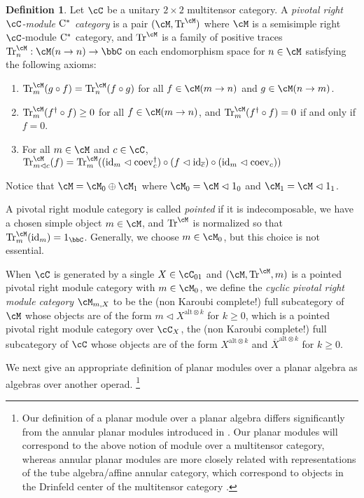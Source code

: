 \documentclass[11pt]{article}
\theoremstyle{plain}
\theoremstyle{definition}
\newtheorem{defn}[thm]{Definition}
\DeclareMathOperator{\coev}{coev}
\DeclareMathOperator{\id}{id}
\DeclareMathOperator{\Tr}{Tr}
\newcommand{\Cstar}{\rm{C^*}}
\begin{document}
\begin{defn}
 \label{def:PivotalModule}
Let $\cC$ be a unitary $2\times 2$ multitensor category.
A \emph{pivotal right $\cC$-module $\Cstar$ category} is a pair $(\cM,\Tr^\cM)$ where
$\cM$ is a semisimple right $\cC$-module $\Cstar$ category, and $\Tr^\cM$ is a family of positive traces $\Tr^\cM_n:\cM(n \to n)\to \bbC$ on each endomorphism space for $n\in \cM$ satisfying the following axioms:
\begin{enumerate}[label={\rm(Tr\arabic*)}]
\item
\label{PivotalModule:tracial}
$\Tr^\cM_m(g \circ f) = \Tr^\cM_n(f\circ g)$ for all $f\in \cM(m\to n)$ and $g\in \cM(n \to m)$.
\item
\label{PivotalModule:positive}
$\Tr^\cM_m(f^\dag \circ f) \geq 0$ for all $f\in \cM(m \to n)$, and $\Tr^\cM_m(f^\dag \circ f) =0$ if and only if $f = 0$.
\item
\label{PivotalModule:compatible}
For all $m\in \cM$ and $c\in \cC$,
$
\Tr^\cM_{m\vartriangleleft c}(f)
=
\Tr^\cM_{m}(
(\id_m \vartriangleleft \coev_c^\dag) \circ (f\vartriangleleft \id_{\overline{c}}) \circ (\id_m \vartriangleleft \coev_c)
)
$
\end{enumerate}
Notice that $\cM = \cM_0 \oplus \cM_1$ where $\cM_0 = \cM \vartriangleleft 1_0$ and $\cM_1 = \cM\vartriangleleft 1_1$.

A pivotal right module category is called \emph{pointed} if it is indecomposable, we have a chosen simple object $m\in \cM$, and $\Tr^\cM$ is normalized so that $\Tr^\cM_m(\id_m) = 1_\bbC$.
Generally, we choose $m\in \cM_0$, but this choice is not essential.

When $\cC$ is generated by a single $X\in \cC_{01}$ and $(\cM,\Tr^\cM,m)$ is a pointed pivotal right module category with $m\in \cM_0$, we define the \emph{cyclic pivotal right module category} $\cM_{m,X}$ to be the (non Karoubi complete!) full subcategory of $\cM$ whose objects are of the form 
$
m \vartriangleleft X^{ \text{alt}\otimes k}
$ 
for $k\geq 0$, which is a pointed pivotal right module category over $\cC_X$, the (non Karoubi complete!) full subcategory of $\cC$ whose objects are of the form $X^{ \text{alt}\otimes k}$ and $\overline{X}^{ \text{alt}\otimes k}$ for $k\geq 0$.
\end{defn}


We next give an appropriate definition of planar modules over a planar algebra as algebras over another operad.
\footnote{
Our definition of a planar module over a planar algebra differs significantly from the annular planar modules introduced in \cite{MR1929335}. 
Our planar modules will correspond to the above notion of module over a multitensor category, 
whereas annular planar modules 
are more closely related with representations of the tube algebra/affine annular category, which correspond to objects in the Drinfeld center of the multitensor category \cite{MR3447719}.
}
\end{document}
